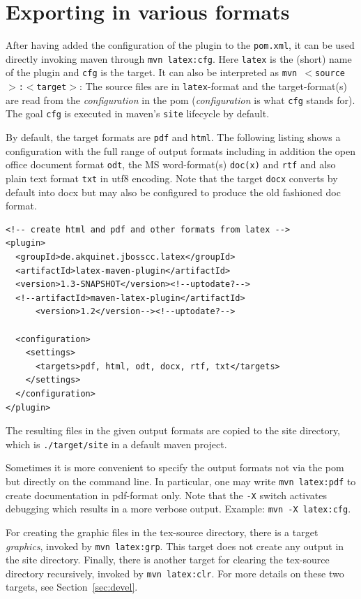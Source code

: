 \documentclass[12pt]{book}
\begin{document}
\section{Exporting in various formats}\label{chap:stableUsage}


After having added the configuration of the plugin to the {\tt pom.xml}, 
it can be used directly invoking maven through 
{\tt mvn latex:cfg}. 
Here {\tt latex} is the (short) name of the plugin and {\tt cfg} is the target. 
It can also be interpreted as {\tt mvn $<$source$>$:$<$target$>$}: 
The source files are in {\tt latex}-format and the target-format(s) 
are read from the {\em configuration} in the pom 
({\em configuration} is what {\tt cfg} stands for). 
The goal {\tt cfg} is executed in maven's {\tt site} lifecycle by default. 

By default, the target formats are {\tt pdf} and {\tt html}. 
The following listing shows a configuration 
with the full range of output formats including in addition 
the open office document format {\tt odt}, 
the MS word-format(s) {\tt doc(x)} and {\tt rtf}
and also plain text format {\tt txt} in utf8 encoding. 
Note that the target {\tt docx} converts by default into \gls{docx} 
but may also be configured to produce the old fashioned \gls{doc} format. 
%
\lstset{language=xml, basicstyle=\small}
\begin{lstlisting}
<!-- create html and pdf and other formats from latex -->
<plugin>
  <groupId>de.akquinet.jbosscc.latex</groupId>
  <artifactId>latex-maven-plugin</artifactId>
  <version>1.3-SNAPSHOT</version><!--uptodate?-->
  <!--artifactId>maven-latex-plugin</artifactId>
      <version>1.2</version--><!--uptodate?-->
	
  <configuration>
    <settings>
      <targets>pdf, html, odt, docx, rtf, txt</targets>
    </settings>
  </configuration>
</plugin>
\end{lstlisting}

The resulting files in the given output formats 
are copied to the site directory, 
which is {\tt ./target/site} in a default maven project. 

Sometimes it is more convenient 
to specify the output formats not via the pom 
but directly on the command line. 
In particular, one may write {\tt mvn latex:pdf} to create documentation 
in pdf-format only. 
Note that the {\tt -X} switch activates debugging 
which results in a more verbose output. 
Example: {\tt mvn -X latex:cfg}. 

For creating the graphic files in the tex-source directory, 
there is a target {\em graphics}, invoked by {\tt mvn latex:grp}. 
This target does not create any output in the site directory. 
Finally,  there is another target for clearing the tex-source directory 
recursively, invoked by {\tt mvn latex:clr}. 
For more details on these two targets, see Section~\ref{sec:devel}. 
\end{document}
